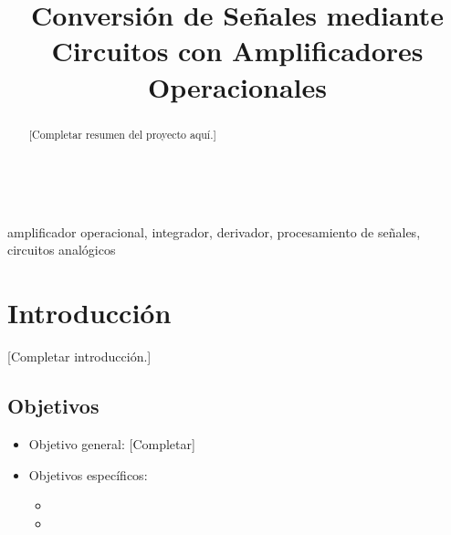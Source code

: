 \documentclass[conference]{IEEEtran}
\begin{document}
\title{Conversión de Señales mediante Circuitos con Amplificadores Operacionales}\\

\author{%
    \and
}

\maketitle

\begin{abstract}
[Completar resumen del proyecto aquí.]
\end{abstract}

\begin{IEEEkeywords}
amplificador operacional, integrador, derivador, procesamiento de señales, circuitos analógicos
\end{IEEEkeywords}

\section{Introducción}
[Completar introducción.]

\subsection{Objetivos}
\begin{itemize}
    \item Objetivo general: [Completar]
    \item Objetivos específicos:
    \begin{itemize}
        \item [Completar]
        \item [Completar]
    \end{itemize}
\end{itemize}
\end{document}

